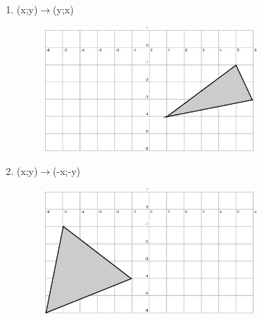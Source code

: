 \begin{enumerate}[noitemsep, label=\textbf{\arabic*}. ]
\begin{enumerate}[noitemsep, label=\textbf{\alph*}. ]
\begin{figure}[H]
\begin{center}
      \vspace{2pt}
    \vspace{.1in}
    \end{center}
 \end{figure}       \label{m39358*uid128}\item (x;y)$\to $(y;x)
    \setcounter{subfigure}{0}
	\begin{figure}[H] %
    \begin{center}
    \label{m39358*id74053!!!underscore!!!media}\label{m39358*id74053!!!underscore!!!printimage}\includegraphics[width=300px]{col11306.imgs/m39358_MG10C14_039.png} %
      \vspace{2pt}
    \vspace{.1in}
    \end{center}
 \end{figure}       \label{m39358*uid129}\item (x;y)$\to $(-x;-y)
    \setcounter{subfigure}{0}
	\begin{figure}[H] %
    \begin{center}
    \label{m39358*id74084!!!underscore!!!media}\label{m39358*id74084!!!underscore!!!printimage}\includegraphics[width=300px]{col11306.imgs/m39358_MG10C14_040.png} %
      \vspace{2pt}
    \vspace{.1in}
    \end{center}
 \end{figure}       \end{enumerate}

\end{enumerate}
